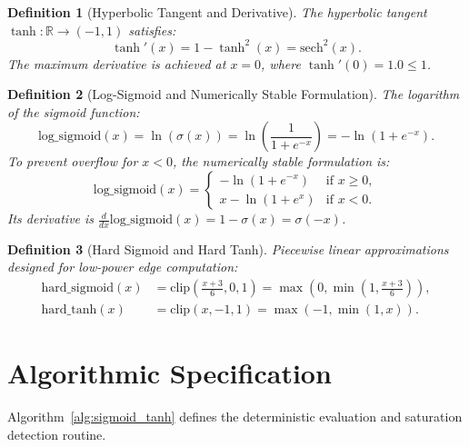 \documentclass[11pt]{article}
\newtheorem{definition}{Definition}
\begin{document}
\begin{definition}[Hyperbolic Tangent and Derivative]
The hyperbolic tangent $\tanh: \mathbb{R} \to (-1, 1)$ satisfies:
\begin{equation}
\tanh'(x) = 1 - \tanh^2(x) = \text{sech}^2(x).
\end{equation}
The maximum derivative is achieved at $x = 0$, where $\tanh'(0) = 1.0 \le 1$.
\end{definition}

\begin{definition}[Log-Sigmoid and Numerically Stable Formulation]
The logarithm of the sigmoid function:
\begin{equation}
\text{log\_sigmoid}(x) = \ln(\sigma(x)) = \ln\left(\frac{1}{1 + e^{-x}}\right) = -\ln(1 + e^{-x}).
\end{equation}
To prevent overflow for $x < 0$, the numerically stable formulation is:
\begin{equation}
\text{log\_sigmoid}(x) = \begin{cases} -\ln(1 + e^{-x}) & \text{if } x \ge 0, \\ x - \ln(1 + e^x) & \text{if } x < 0. \end{cases}
\end{equation}
Its derivative is $\frac{d}{dx} \text{log\_sigmoid}(x) = 1 - \sigma(x) = \sigma(-x)$.
\end{definition}

\begin{definition}[Hard Sigmoid and Hard Tanh]
Piecewise linear approximations designed for low-power edge computation:
\begin{align}
\text{hard\_sigmoid}(x) &= \text{clip}\left(\frac{x + 3}{6}, 0, 1\right) = \max\left(0, \min\left(1, \frac{x+3}{6}\right)\right), \\
\text{hard\_tanh}(x) &= \text{clip}(x, -1, 1) = \max(-1, \min(1, x)).
\end{align}
\end{definition}

\section{Algorithmic Specification}
\label{sec:algorithm}

Algorithm~\ref{alg:sigmoid_tanh} defines the deterministic evaluation and saturation detection routine.
\end{document}
